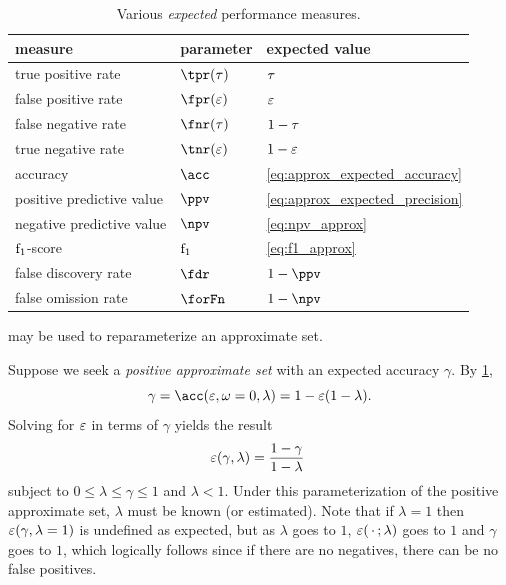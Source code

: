 \begin{table}
	\centering
	\caption{Various \emph{expected} performance measures.}
	\label{tbl:perf_sum}
	\begin{tabular}{@{} l l l @{}}
		\toprule
		\textbf{measure} & \textbf{parameter} & \textbf{expected value}\\
		\midrule
		true positive rate & $\tpr(\tprate)$ & $\tau$\\
		false positive rate & $\fpr(\fprate)$ & $\varepsilon$\\
		false negative rate & $\fnr(\tprate)$ & $1-\tau$\\
		true negative rate & $\tnr(\fprate)$ & $1-\varepsilon$\\
		accuracy & $\acc$ & \cref{eq:approx_expected_accuracy}\\
		positive predictive value & $\ppv$ & \cref{eq:approx_expected_precision}\\
		negative predictive value & $\npv$ & \cref{eq:npv_approx}\\
		$\mathrm{f}_1$-score & $\mathrm{f}_1$ & \cref{eq:f1_approx}\\
		false discovery rate & $\fdr$ & $1-\ppv$\\
		false omission rate & $\forFn$ & $1-\npv$\\
		\bottomrule
	\end{tabular}
\end{table}
 may be used to reparameterize an approximate set.
\begin{example}
	Suppose we seek a \emph{positive approximate set} with an expected accuracy
	$\gamma$. By \cref{tbl:perf_sum},
	\begin{equation}
	\gamma = \acc(\fprate,\fnrate=0,\lambda) = 1 - \fprate(1 - \lambda).
	\end{equation}
	Solving for $\varepsilon$ in terms of $\gamma$ yields the result
	\begin{equation}
	\varepsilon(\gamma, \lambda) = \frac{1 - \gamma}{1 -
		\lambda}\
	\end{equation}
	subject to $0 \leq \lambda \leq \gamma \leq 1$ and $\lambda < 1$.
	Under this parameterization of the 	positive approximate set, $\lambda$
	must be known (or estimated).
	Note that if $\lambda = 1$ then $\varepsilon(\gamma, \lambda=1)$ is undefined as expected, but as $\lambda$ goes to $1$, $\varepsilon(\,\cdot\,; \lambda)$ goes to $1$ and $\gamma$ goes to $1$, which logically follows since if there are no negatives, there can be no false positives.
\end{example}


